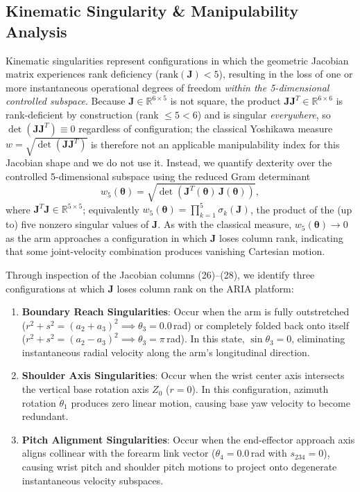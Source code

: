 \documentclass[journal]{IEEEtran}
\begin{document}
\subsection{Kinematic Singularity \& Manipulability Analysis}
Kinematic singularities represent configurations in which the geometric Jacobian matrix experiences rank deficiency ($\text{rank}(\mathbf{J}) < 5$), resulting in the loss of one or more instantaneous operational degrees of freedom \emph{within the 5-dimensional controlled subspace}. Because $\mathbf{J}\in\mathbb{R}^{6\times5}$ is not square, the product $\mathbf{J}\mathbf{J}^T\in\mathbb{R}^{6\times6}$ is rank-deficient by construction (rank $\le 5 < 6$) and is singular \emph{everywhere}, so $\det(\mathbf{J}\mathbf{J}^T) \equiv 0$ regardless of configuration; the classical Yoshikawa measure $w=\sqrt{\det(\mathbf{J}\mathbf{J}^T)}$ is therefore not an applicable manipulability index for this Jacobian shape and we do not use it. Instead, we quantify dexterity over the controlled 5-dimensional subspace using the reduced Gram determinant
\begin{equation}
w_5(\boldsymbol{\theta}) = \sqrt{\det\left( \mathbf{J}^T(\boldsymbol{\theta})\, \mathbf{J}(\boldsymbol{\theta}) \right)},
\end{equation}
where $\mathbf{J}^T\mathbf{J}\in\mathbb{R}^{5\times5}$; equivalently $w_5(\boldsymbol{\theta}) = \prod_{k=1}^{5}\sigma_k(\mathbf{J})$, the product of the (up to) five nonzero singular values of $\mathbf{J}$. As with the classical measure, $w_5(\boldsymbol{\theta})\to 0$ as the arm approaches a configuration in which $\mathbf{J}$ loses column rank, indicating that some joint-velocity combination produces vanishing Cartesian motion.

Through inspection of the Jacobian columns (26)–(28), we identify three configurations at which $\mathbf{J}$ loses column rank on the ARIA platform:
\begin{enumerate}
    \item \textbf{Boundary Reach Singularities}: Occur when the arm is fully outstretched ($r^2 + s^2 = (a_2 + a_3)^2 \implies \theta_3 = 0.0$\,rad) or completely folded back onto itself ($r^2 + s^2 = (a_2 - a_3)^2 \implies \theta_3 = \pi$\,rad). In this state, $\sin\theta_3 = 0$, eliminating instantaneous radial velocity along the arm's longitudinal direction.
    \item \textbf{Shoulder Axis Singularities}: Occur when the wrist center axis intersects the vertical base rotation axis $Z_0$ ($r = 0$). In this configuration, azimuth rotation $\dot{\theta}_1$ produces zero linear motion, causing base yaw velocity to become redundant.
    \item \textbf{Pitch Alignment Singularities}: Occur when the end-effector approach axis aligns collinear with the forearm link vector ($\theta_4 = 0.0$\,rad with $s_{234} = 0$), causing wrist pitch and shoulder pitch motions to project onto degenerate instantaneous velocity subspaces.
\end{enumerate}
\end{document}
